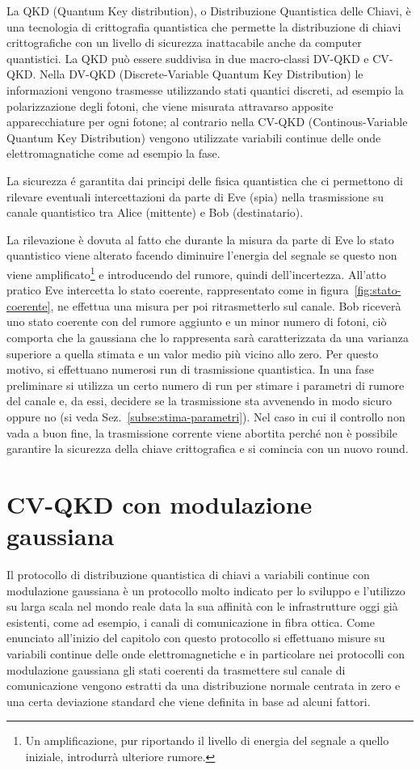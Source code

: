 La QKD (Quantum Key distribution), o Distribuzione Quantistica delle Chiavi, \`e una tecnologia di crittografia quantistica che permette la distribuzione di chiavi crittografiche con un livello di sicurezza inattacabile anche da computer quantistici. La QKD pu\`o essere suddivisa in due macro-classi DV-QKD e CV-QKD. Nella DV-QKD (Discrete-Variable Quantum Key Distribution) le informazioni vengono trasmesse utilizzando stati quantici discreti, ad esempio la polarizzazione degli fotoni, che viene misurata attravarso apposite apparecchiature per ogni fotone; al contrario nella CV-QKD (Continous-Variable Quantum Key Distribution) vengono utilizzate variabili continue delle onde elettromagnatiche come ad esempio la fase.

La sicurezza \'e garantita dai principi delle fisica quantistica che ci permettono di rilevare eventuali intercettazioni da parte di Eve (spia) nella trasmissione su canale quantistico tra Alice (mittente) e Bob (destinatario).

La rilevazione \`e dovuta al fatto che durante la misura da parte di Eve lo stato quantistico viene alterato facendo diminuire l'energia del segnale se questo non viene amplificato\footnote{Un amplificazione, pur riportando il livello di energia del segnale a quello iniziale, introdurr\`a ulteriore rumore.} e introducendo del rumore, quindi dell'incertezza. All'atto pratico Eve intercetta lo stato coerente, rappresentato come in figura~\ref{fig:stato-coerente}, ne effettua una misura per poi ritrasmetterlo sul canale. Bob ricever\`a uno stato coerente con del rumore aggiunto e un minor numero di fotoni, ci\`o comporta che la gaussiana che lo rappresenta sar\`a caratterizzata da una varianza superiore a quella stimata e un valor medio pi\`u vicino allo zero. Per questo motivo, si effettuano numerosi run di trasmissione quantistica. In una fase preliminare si utilizza un certo numero di run per stimare i parametri di rumore del canale e, da essi, decidere se la trasmissione sta avvenendo in modo sicuro oppure no (si veda Sez.~\ref{subse:stima-parametri}). Nel caso in cui il controllo non vada a buon fine, la trasmissione corrente viene abortita perch\'e non \`e possibile garantire la sicurezza della chiave crittografica e si comincia con un nuovo round.

\section{CV-QKD con modulazione gaussiana}
Il protocollo di distribuzione quantistica di chiavi a variabili continue con modulazione gaussiana \`e un protocollo molto indicato per lo sviluppo e l'utilizzo su larga scala nel mondo reale data la sua affinit\`a con le infrastrutture oggi gi\`a esistenti, come ad esempio, i canali di comunicazione in fibra ottica. Come enunciato all'inizio del capitolo con questo protocollo si effettuano misure su variabili continue delle onde elettromagnetiche e in particolare nei protocolli con modulazione gaussiana gli stati coerenti da trasmettere sul canale di comunicazione vengono estratti da una distribuzione normale centrata in zero e una certa deviazione standard che viene definita in base ad alcuni fattori.

